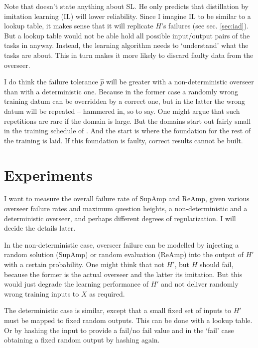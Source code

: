 \documentclass{farlamp}
\begin{document}
Note that \textcite{ChriRelAmp} doesn't state anything about SL. He only
predicts that distillation by imitation learning (IL) will lower reliability.
Since I imagine IL to be similar to a lookup table, it makes sense that it will
replicate $H$'s failures (see sec. \ref{sec:iad}). But a lookup table would not
be able hold all possible input/output pairs of the tasks in
\textcite{CSASupAmp} anyway. Instead, the learning algorithm needs to
‘understand’ what the tasks are about. This in turn makes it more likely to
discard faulty data from the overseer.

I do think the failure tolerance $\hat{p}$ will be greater with a
non-deterministic overseer than with a deterministic one. Because in the former
case a randomly wrong training datum can be overridden by a correct one, but in
the latter the wrong datum will be repeated – hammered in, so to say. One might
argue that such repetitions are rare if the domain is large. But the domains
start out fairly small in the training schedule of \textcite{CSASupAmp}. And the
start is where the foundation for the rest of the training is laid. If this
foundation is faulty, correct results cannot be built.


\section{Experiments}

I want to measure the overall failure rate of SupAmp and ReAmp, given various
overseer failure rates and maximum question heights, a non-deterministic and a
deterministic overseer, and perhaps different degrees of regularization. I will
decide the details later.

In the non-deterministic case, overseer failure can be modelled by injecting a
random solution (SupAmp) or random evaluation (ReAmp) into the output of $H'$
with a certain probability. One might think that not $H'$, but $H$ should fail,
because the former is the actual overseer and the latter its imitation. But this
would just degrade the learning performance of $H'$ and not deliver randomly
wrong training inputs to $X$ as required.

The deterministic case is similar, except that a small fixed set of inputs to
$H'$ must be mapped to fixed random outputs. This can be done with a lookup
table. Or by hashing the input to provide a fail/no fail value and in the ‘fail’
case obtaining a fixed random output by hashing again.


\begin{FlushLeft}
\printbibliography
\end{FlushLeft}
\end{document}
